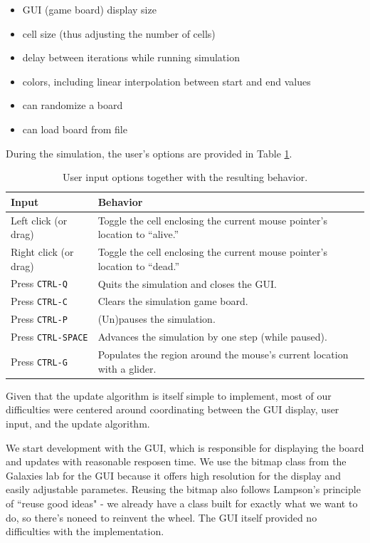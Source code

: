 \documentclass[onecolumn,12pt]{IEEEtran}
\begin{document}
  \begin{itemize}
    \item GUI (game board) display size
    \item cell size (thus adjusting the number of cells) 
    \item delay between iterations while running simulation
    \item colors, including linear interpolation between start and end values
    \item can randomize a board
    \item can load board from file
  \end{itemize} 
  During the simulation, the user's options are provided in Table
  \ref{tab:gui}.
  \begin{table}[t]
    \centering
    \begin{tabular}[b]{@{}lp{10cm}@{}} \toprule
      Input & Behavior \\ \midrule
      Left click (or drag) & Toggle the cell enclosing the current mouse
      pointer's location to ``alive.'' \\
      Right click (or drag) & Toggle the cell enclosing the current mouse
      pointer's location to ``dead.'' \\
      Press \texttt{CTRL-Q} & Quits the simulation and closes the GUI. \\
      Press \texttt{CTRL-C} & Clears the simulation game board. \\
      Press \texttt{CTRL-P} & (Un)pauses the simulation. \\
      Press \texttt{CTRL-SPACE} & Advances the simulation by one step (while
      paused). \\
      Press \texttt{CTRL-G} & Populates the region around the mouse's current
      location with a glider. \\ \bottomrule
    \end{tabular}
    \caption{User input options together with the resulting behavior.}
    \label{tab:gui}
  \end{table}
  Given that the update algorithm is itself simple to implement, most of our
  difficulties were centered around coordinating between the GUI display, user
  input, and the update algorithm.	

  We start development with the GUI, which is responsible for displaying the
  board and updates with reasonable resposen time. We use the bitmap class from
  the Galaxies lab for the GUI because it offers high resolution for the display
  and easily adjustable parametes. Reusing the bitmap also follows Lampson's
  principle of ``reuse good ideas" - we already have a class built for exactly
  what we want to do, so there's noneed to reinvent the wheel. The GUI itself
  provided no difficulties with the implementation. 
\end{document}
